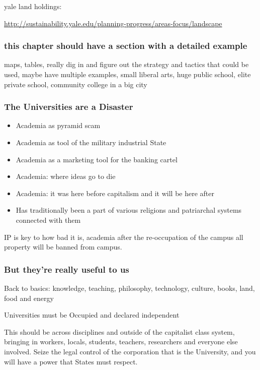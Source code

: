 yale land holdings:

\url{http://sustainability.yale.edu/planning-progress/areas-focus/landscape}

\subsubsection{this chapter should have a section with a detailed
example}\label{this-chapter-should-have-a-section-with-a-detailed-example}

maps, tables, really dig in and figure out the strategy and tactics that
could be used, maybe have multiple examples, small liberal arts, huge
public school, elite private school, community college in a big city

\subsubsection{The Universities are a
Disaster}\label{the-universities-are-a-disaster}

\begin{itemize}
\item
  Academia as pyramid scam
\item
  Academia as tool of the military industrial State
\item
  Academia as a marketing tool for the banking cartel
\item
  Academia: where ideas go to die
\item
  Academia: it was here before capitalism and it will be here after
\item
  Has traditionally been a part of various religions and patriarchal
  systems connected with them
\end{itemize}

IP is key to how bad it is, academia after the re-occupation of the
campus all property will be banned from campus.

\subsubsection{But they're really useful to
us}\label{but-theyre-really-useful-to-us}

Back to basics: knowledge, teaching, philosophy, technology, culture,
books, land, food and energy

Universities must be Occupied and declared independent

This should be across disciplines and outside of the capitalist class
system, bringing in workers, locals, students, teachers, researchers and
everyone else involved. Seize the legal control of the corporation that
is the University, and you will have a power that States must respect.

